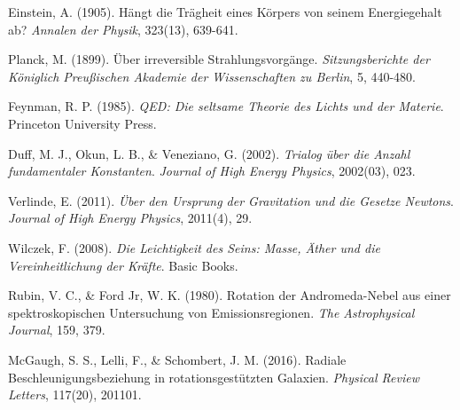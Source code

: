 \documentclass[12pt,a4paper]{article}
\begin{document}
\begin{thebibliography}{99}
		 Einstein, A. (1905). Hängt die Trägheit eines Körpers von seinem Energiegehalt ab? \textit{Annalen der Physik}, 323(13), 639-641.
		
		 Planck, M. (1899). Über irreversible Strahlungsvorgänge. \textit{Sitzungsberichte der Königlich Preußischen Akademie der Wissenschaften zu Berlin}, 5, 440-480.
		
		 Feynman, R. P. (1985). \textit{QED: Die seltsame Theorie des Lichts und der Materie}. Princeton University Press.
		
		 Duff, M. J., Okun, L. B., \& Veneziano, G. (2002). \textit{Trialog über die Anzahl fundamentaler Konstanten}. \textit{Journal of High Energy Physics}, 2002(03), 023.
		
		 Verlinde, E. (2011). \textit{Über den Ursprung der Gravitation und die Gesetze Newtons}. \textit{Journal of High Energy Physics}, 2011(4), 29.
		
		 Wilczek, F. (2008). \textit{Die Leichtigkeit des Seins: Masse, Äther und die Vereinheitlichung der Kräfte}. Basic Books.
		
		 Rubin, V. C., \& Ford Jr, W. K. (1980). Rotation der Andromeda-Nebel aus einer spektroskopischen Untersuchung von Emissionsregionen. \textit{The Astrophysical Journal}, 159, 379.
		
		 McGaugh, S. S., Lelli, F., \& Schombert, J. M. (2016). Radiale Beschleunigungsbeziehung in rotationsgestützten Galaxien. \textit{Physical Review Letters}, 117(20), 201101.
	\end{thebibliography}
	
\end{document}
